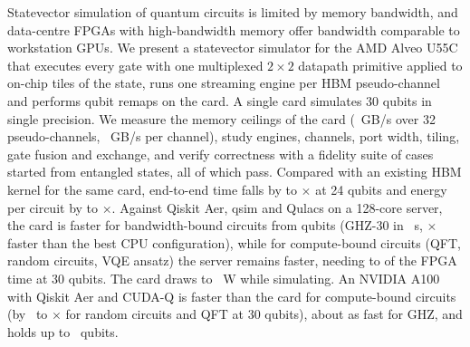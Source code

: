 Statevector simulation of quantum circuits is limited by memory bandwidth, and data-centre FPGAs with high-bandwidth memory offer bandwidth comparable to workstation GPUs. We present a statevector simulator for the AMD Alveo U55C that executes every gate with one multiplexed $2\times2$ datapath primitive applied to on-chip tiles of the state, runs one streaming engine per HBM pseudo-channel and performs qubit remaps on the card. A single card simulates 30 qubits in single precision. We measure the memory ceilings of the card (\NumHbmThirtytwoCopy~GB/s over 32 pseudo-channels, \NumHbmSixteenPerCURead~GB/s per channel), study engines, channels, port width, tiling, gate fusion and exchange, and verify correctness with a fidelity suite of \NumSuiteTotal{} cases started from entangled states, all of which pass. Compared with an existing HBM kernel for the same card, end-to-end time falls by \NumSpeedupVsevenMin to \NumSpeedupVsevenMax$\times$ at 24 qubits and energy per circuit by \NumEnergyVsevenRatioMin to \NumEnergyVsevenRatioMax$\times$. Against Qiskit Aer, qsim and Qulacs on a 128-core server, the card is faster for bandwidth-bound circuits from \NumXplatGhzCrossN{} qubits (GHZ-30 in \NumFlagGhzThirtyEtoE~s, \NumXplatRatioGhzThirty$\times$ faster than the best CPU configuration), while for compute-bound circuits (QFT, random circuits, VQE ansatz) the server remains faster, needing \NumXplatRatioOtherThirtyMin to \NumXplatRatioOtherThirtyMax{} of the FPGA time at 30 qubits. The card draws \NumFlagPowerMin to \NumFlagPowerMax~W while simulating. An NVIDIA A100 with Qiskit Aer and CUDA-Q is faster than the card for compute-bound circuits (by \NumXplatBestGpuRatioRqcThirty~to \NumXplatBestGpuRatioQftThirty$\times$ for random circuits and QFT at 30 qubits), about as fast for GHZ, and holds up to \NumGpuCudaqSingleMaxN~qubits.
